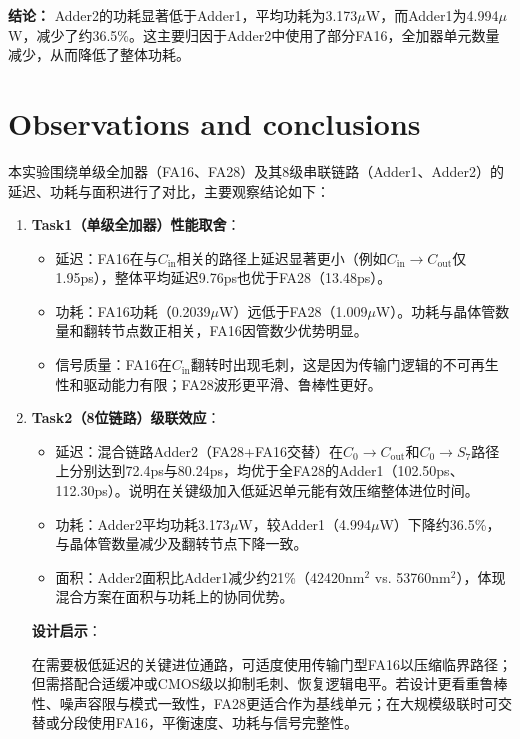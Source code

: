 \documentclass[UTF8,12pt,a4paper]{ctexart}
\begin{document}
\textbf{结论：}
Adder2的功耗显著低于Adder1，平均功耗为3.173$\mu$W，而Adder1为4.994$\mu$W，减少了约36.5\%。这主要归因于Adder2中使用了部分FA16，全加器单元数量减少，从而降低了整体功耗。

\newpage
\section{Observations and conclusions}

本实验围绕单级全加器（FA16、FA28）及其8级串联链路（Adder1、Adder2）的延迟、功耗与面积进行了对比，主要观察结论如下：

\begin{enumerate}[label=\arabic*)]
    \item \textbf{Task1（单级全加器）性能取舍}：
    \begin{itemize}
        \item 延迟：FA16在与$C_{\text{in}}$相关的路径上延迟显著更小（例如$C_{\text{in}}\rightarrow C_{\text{out}}$仅1.95ps），整体平均延迟9.76ps也优于FA28（13.48ps）。
        \item 功耗：FA16功耗（0.2039$\mu$W）远低于FA28（1.009$\mu$W）。功耗与晶体管数量和翻转节点数正相关，FA16因管数少优势明显。
        \item 信号质量：FA16在$C_{\text{in}}$翻转时出现毛刺，这是因为传输门逻辑的不可再生性和驱动能力有限；FA28波形更平滑、鲁棒性更好。
    \end{itemize}

    \item \textbf{Task2（8位链路）级联效应}：
    \begin{itemize}
        \item 延迟：混合链路Adder2（FA28+FA16交替）在$C_0\rightarrow C_{\text{out}}$和$C_0\rightarrow S_7$路径上分别达到72.4ps与80.24ps，均优于全FA28的Adder1（102.50ps、112.30ps）。说明在关键级加入低延迟单元能有效压缩整体进位时间。
        \item 功耗：Adder2平均功耗3.173$\mu$W，较Adder1（4.994$\mu$W）下降约36.5\%，与晶体管数量减少及翻转节点下降一致。
        \item 面积：Adder2面积比Adder1减少约21\%（42420nm$^2$ vs. 53760nm$^2$），体现混合方案在面积与功耗上的协同优势。
    \end{itemize}

\textbf{设计启示}：

在需要极低延迟的关键进位通路，可适度使用传输门型FA16以压缩临界路径；但需搭配合适缓冲或CMOS级以抑制毛刺、恢复逻辑电平。若设计更看重鲁棒性、噪声容限与模式一致性，FA28更适合作为基线单元；在大规模级联时可交替或分段使用FA16，平衡速度、功耗与信号完整性。
\end{enumerate}
\end{document}
